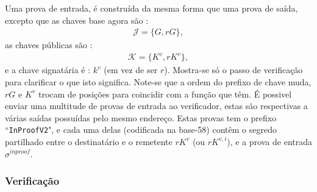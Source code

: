 Uma prova de entrada, é construída da mesma forma que uma prova de saída, excepto que as chaves base agora são : 
\begin{align*}
\mathcal{J} = \{G, r G\} ,
\end{align*}
as chaves públicas são :
\begin{align*}
\mathcal{K} = \{K^v, r K^{v}\} ,
\end{align*}
e a chave signatária é : $k^v$ (em vez de ser $r$). Mostra-se só o passo de verificação para clarificar o que isto significa. Note-se que a ordem do prefixo de chave muda, $r G$ e $K^v$ trocam de posições para coincidir com a função que têm.%
É possivel enviar uma multitude de provas de entrada ao verificador, estas são respectivas a várias saídas possuídas pelo mesmo endereço. Estas provas tem o prefixo ``{\tt InProofV2}", e cada uma delas (codificada na base-58) contêm o segredo partilhado entre o destinatário e o remetente $r K^v$ (ou $r K^{v,i}$), e a prova de entrada $\sigma^{inproof}$.     
\subsubsection*{Verificação}

